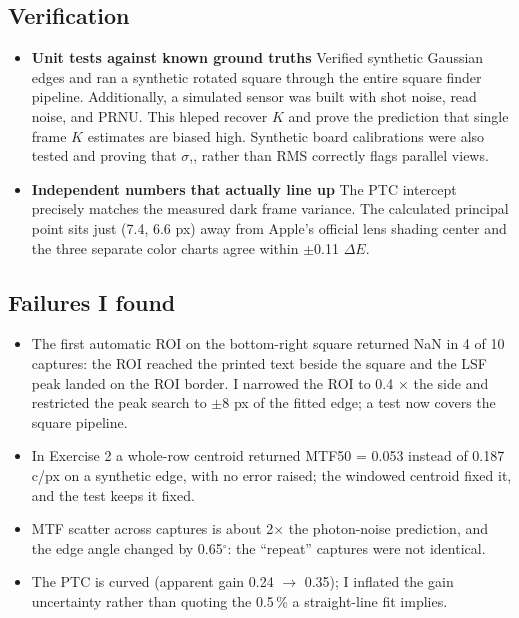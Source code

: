 \documentclass[9pt]{extarticle}
\begin{document}
\subsection{Verification}
\begin{itemize}
\item \textbf{Unit tests against known ground truths} Verified synthetic Gaussian edges and ran a synthetic rotated square through the entire square finder pipeline. Additionally, a simulated sensor was built with shot noise, read noise, and PRNU. This hleped recover $K$ and prove the prediction that single frame $K$ estimates are biased high. Synthetic board calibrations were also tested and proving that $\sigma$,, rather than RMS correctly flags parallel views.

\item \textbf{Independent numbers that actually line up} The PTC intercept precisely matches the measured dark frame variance. The calculated principal point sits just (7.4, 6.6 px) away from Apple's official lens shading center and the three separate color charts agree within $\pm$0.11 $\Delta E$.

\end{itemize}

\subsection{Failures I found}
\begin{itemize}
\item The first automatic ROI on the bottom-right square returned NaN in 4 of 10 captures: the ROI reached the printed text beside the square and the LSF peak landed on the ROI border. I narrowed the ROI to 0.4 $\times$ the side and restricted the peak search to $\pm$8 px of the fitted edge; a test now covers the square pipeline.
\item In Exercise 2 a whole-row centroid returned MTF50 = 0.053 instead of 0.187 c/px on a synthetic edge, with no error raised; the windowed centroid fixed it, and the test keeps it fixed.
\item MTF scatter across captures is about 2$\times$ the photon-noise prediction, and the edge angle changed by 0.65$^\circ$: the ``repeat'' captures were not identical.
\item The PTC is curved (apparent gain 0.24 $\to$ 0.35); I inflated the gain uncertainty rather than quoting the 0.5\,\% a straight-line fit implies.
\end{itemize}
\end{document}
